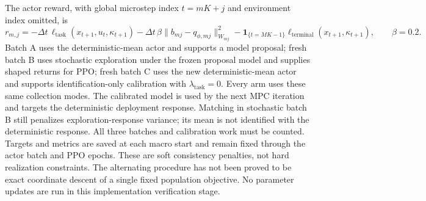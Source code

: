 The actor reward, with global microstep index $t=mK+j$ and environment
index omitted, is
\begin{equation}
 r_{m,j}=-\Delta t\,\ell_{\mathrm{task}}(x_{t+1},u_t,\kappa_{t+1})
     -\Delta t\,\beta\|b_{mj}-q_{\phi,mj}\|_{W_{mj}}^2
     -\mathbf 1_{\{t=MK-1\}}
       \ell_{\mathrm{terminal}}(x_{t+1},\kappa_{t+1}),\qquad\beta=0.2.
 \label{eq:tr-shaped-reward}
\end{equation}
Batch A uses the deterministic-mean actor and supports a model proposal;
fresh batch B uses stochastic exploration under the frozen proposal model
and supplies shaped returns for PPO; fresh batch C uses the new
deterministic-mean actor and supports identification-only calibration with
$\lambda_{\mathrm{task}}=0$. Every arm uses these same collection modes.
The calibrated model is used by the next MPC iteration and targets the
deterministic deployment response. Matching in stochastic batch B still
penalizes exploration-response variance; its mean is not identified with
the deterministic response. All three batches and calibration work must
be counted.
Targets and metrics are saved at each macro start and remain fixed
through the actor batch and PPO epochs. These are soft consistency
penalties, not hard realization constraints. The alternating procedure
has not been proved to be exact coordinate descent of a single fixed
population objective. No parameter updates are run in this implementation
verification stage.

